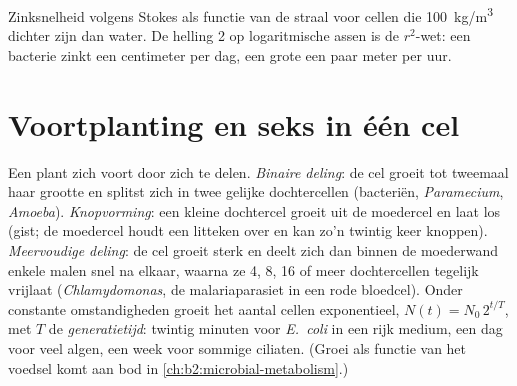\begin{omfigure}

{\small Zinksnelheid volgens Stokes als functie van de straal voor cellen die
\qty{100}{kg/m^3} dichter zijn dan water. De helling 2 op logaritmische
assen is de $r^2$-wet: een bacterie zinkt een centimeter per dag, een grote
 een paar meter per uur.}
\end{omfigure}

\section{Voortplanting en seks in één cel}

\begin{definition}\label{def:b2:unicellular-diversity:division}
Een  plant zich voort door zich te delen. \emph{Binaire
deling}: de cel groeit tot tweemaal haar grootte en splitst zich in twee
gelijke dochtercellen (bacteriën, \emph{Paramecium}, \emph{Amoeba}).
\emph{Knopvorming}: een kleine dochtercel groeit uit de moedercel en laat
los (gist; de moedercel houdt een litteken over en kan zo'n twintig keer
knoppen). \emph{Meervoudige deling}: de cel groeit sterk en deelt zich
dan binnen de moederwand enkele malen snel na elkaar, waarna ze 4, 8,
16 of meer dochtercellen tegelijk vrijlaat (\emph{Chlamydomonas}, de
malariaparasiet in een rode bloedcel). Onder constante omstandigheden
groeit het aantal cellen exponentieel, $N(t) = N_0\,2^{t/T}$, met $T$ de
\emph{generatietijd}: twintig minuten voor
\emph{E.~coli} in een rijk medium, een dag voor veel algen, een week voor
sommige ciliaten. (Groei als functie van het voedsel komt aan bod in
\cref{ch:b2:microbial-metabolism}.)
\end{definition}

